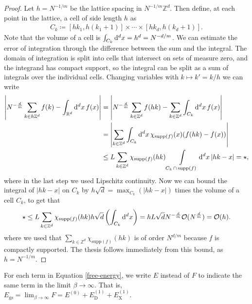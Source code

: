 \begin{proof}
	Let $h=N^{-1/m}$ be the lattice spacing in $N^{-1/m}\mathbb{Z}^d$. Then define, at each
	point in the lattice, a cell of side length $h$ as
	\begin{align*}
		C_k \coloneq [hk_1,h(k_1+1)]\times\cdots\times[hk_d,h(k_d+1)].
	\end{align*}
	Note that the volume of a cell is $\int_{C_k}\mathrm{d}^dx=h^d=N^{-d/m}$. We can estimate the error of
	integration through the difference between the sum and the integral. The domain
	of integration is split into cells that intersect on sets of measure zero, and the
	integrand has compact support, so the integral can be split as a sum of integrals over the
	individual cells. Changing variables with $k\mapsto k'=k/h$ we can write
	\begin{align*}
		\left\vert N^{-\frac{d}{m}}\sum_{k\in h\mathbb{Z}^d}f(k) - \int_{\mathbb{R}^d}\mathrm{d}^dx\,f(x) \right\vert
		&= \left\vert N^{-\frac{d}{m}}\sum_{k\in \mathbb{Z}^d}f(hk) - \sum_{k\in\mathbb{Z}^d}\int_{C_k}\mathrm{d}^dx\,f(x) \right\vert\\
		&= \left\vert \sum_{k\in\mathbb{Z}^d}\int_{C_k}\mathrm{d}^dx\,\chi_{\mathrm{supp}(f)}(x)(f(hk)-f(x))\right\vert\\
		&\leq L\sum_{k\in\mathbb{Z}^d}\chi_{\mathrm{supp}(f)}(hk)\int\limits_{C_k\,\cap\,\mathrm{supp}(f)}\mathrm{d}^dx\,\vert hk-x\vert
		= \star,
	\end{align*}
	where in the last step we used Lipschitz continuity. Now we can bound the integral of
	$\vert hk-x\vert$ on $C_k$ by $h\sqrt{d}=\max_{C_k}(\vert hk-x\vert)$ times the
	volume of a cell $C_k$, to get that
	\begin{align*}
		\star \leq L\sum_{k\in\mathbb{Z}^d}\chi_{\mathrm{supp}(f)}(hk)h\sqrt{d}\left(\int_{C_{k}}\mathrm{d}^dx\right)
		= hL\sqrt{d}N^{-\frac{d}{m}}\mathcal{O}(N^{\frac{d}{m}}) = \mathcal{O}(h).
	\end{align*}
	where we used that $\sum_{k\in\mathbb{Z}^d}\chi_{\mathrm{supp}(f)}(hk)$ is of order $N^{d/m}$
	because $f$ is compactly supported. The thesis follows immediately from this bound, as
	$h = N^{-1/m}$.
\end{proof}

For each term in Equation \eqref{free-energy}, we write $E$ instead of $F$ to indicate the
same term in the limit $\beta\to\infty$. That is, $E_\mathrm{gs} = \lim_{\beta\to\infty}F =
E^{(0)} + E^{(1)}_\mathrm{D} + E^{(1)}_\mathrm{X}$.

